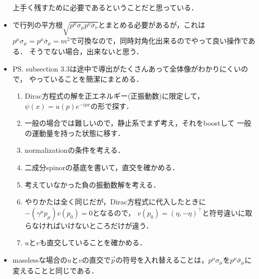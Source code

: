 \begin{itemize}
		上手く残すために必要であるということだと思っている．
	\item {}で行列の平方根$\sqrt{p^{\mu}\sigma_{\mu} p^{\nu} \bar{\sigma}_{\nu}}$とまとめる必要があるが，これは$p^{\mu}\sigma_{\mu} = p^{\mu}\bar{\sigma}_{\mu}= m^2$で可換なので，同時対角化出来るのでやって良い操作である．
		そうでない場合，出来ないと思う．
	\item PS. subsection 3.3は途中で導出がたくさんあって全体像がわかりにくいので，
		やっていることを簡潔にまとめる．
		\begin{enumerate}
			\item Dirac方程式の解を正エネルギー(正振動数)に限定して，$\psi(x) = u(p)e^{-ipx}$の形で探す．
			\item 一般の場合では難しいので，静止系でまず考え，それをboostして
				一般の運動量を持った状態に移す．
			\item normalizationの条件を考える．
			\item 二成分spinorの基底を書いて，直交を確かめる．
			\item 考えていなかった負の振動数解を考える．
			\item やりかたは全く同じだが，Dirac方程式に代入したときに$-(\gamma^{\mu}p_{\mu})v(p_0) = 0$となるので，
				$v(p_0)=(\eta, -\eta)^{\top}$と符号違いに取らなければいけないところだけが違う．
			\item $u$と$v$も直交していることを確かめる．
		\end{enumerate}
	\item masslessな場合の$u$と$v$の直交で$\vec{p}$の符号を入れ替えることは，$p^{\mu}\sigma_{\mu}$を$p^{\mu}\bar{\sigma}_{\mu}$に変えることと同じである．
\end{itemize}
